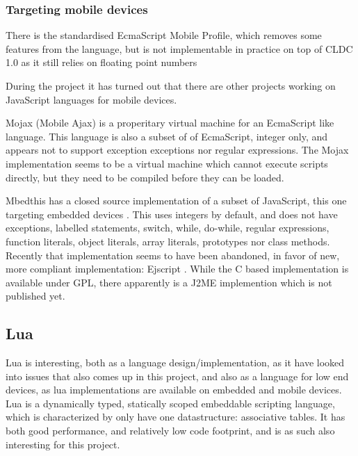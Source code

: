 \documentclass[11pt]{report}
\begin{document}
\subsubsection{Targeting mobile devices}

There is the standardised EcmaScript Mobile Profile, which removes some features from the language, but is not implementable in practice on top of CLDC 1.0 as it still relies on floating point numbers

During the project it has turned out that there are other projects working on JavaScript languages for mobile devices.

Mojax (Mobile Ajax) \cite{mojax} is a properitary virtual machine for an EcmaScript like language. This language is also a subset of of EcmaScript, integer only, and appears not to support exception exceptions nor regular expressions.
The Mojax implementation seems to be a virtual machine which cannot execute scripts directly, but they need to be compiled before they can be loaded.


Mbedthis has a closed source implementation of a subset of JavaScript, this one targeting embedded devices \cite{mbedthis}. This uses integers by default, and does not have exceptions, labelled statements, switch, while, do-while, regular expressions, function literals, object literals, array literals, prototypes nor class methods.
Recently that implementation seems to have been abandoned, in favor of new, more compliant implementation: Ejscript \cite{ejscript}.
While the C based implementation is available under GPL, there apparently is a J2ME implemention which is not published yet.

\subsection{Lua}

Lua is interesting, both as a language design/implementation, as it have looked into issues that also comes up in this project, and also as a language for low end devices, as lua implementations are available on embedded and mobile devices.
Lua is a dynamically typed, statically scoped embeddable scripting language, which is characterized by only have one datastructure: associative tables.
It has both good performance, and relatively low code footprint, and is as such also interesting for this project.
\end{document}
